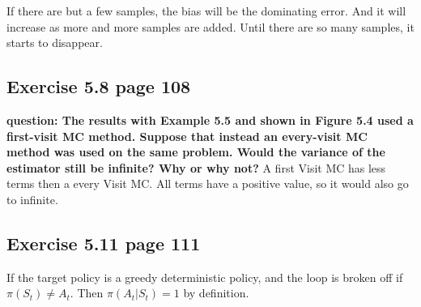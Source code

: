 If there are but a few samples, the bias will be the dominating error. And it will increase as more and more samples are added. Until there are so many samples, it starts to disappear.

\subsection{Exercise 5.8 page 108}
\textbf{question: The results with Example 5.5 and shown in Figure 5.4 used a first-visit MC method. Suppose that instead an every-visit MC method was used on the same problem. Would the variance of the estimator still be infinite? Why or why not?}
A first Visit MC has less terms then a every Visit MC. All terms have a positive value, so it would also go to infinite.

\subsection{Exercise 5.11 page 111}
If the target policy is a greedy deterministic policy, and the loop is broken off if $\pi (S_t) \neq A_t$. Then $\pi(A_t|S_t)=1$ by definition.  
